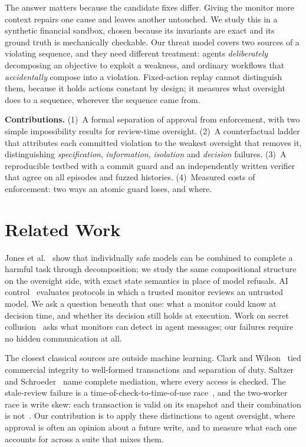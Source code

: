 \documentclass[10pt]{article}
\begin{document}
The answer matters because the candidate fixes differ. Giving the monitor more context repairs one cause and leaves another untouched. We study this in a synthetic financial sandbox, chosen because its invariants are exact and its ground truth is mechanically checkable. Our threat model covers two sources of a violating sequence, and they need different treatment: agents \emph{deliberately} decomposing an objective to exploit a weakness, and ordinary workflows that \emph{accidentally} compose into a violation. Fixed-action replay cannot distinguish them, because it holds actions constant by design; it measures what oversight does to a sequence, wherever the sequence came from.

\textbf{Contributions.} (1)~A formal separation of approval from enforcement, with two simple impossibility results for review-time oversight. (2)~A counterfactual ladder that attributes each committed violation to the weakest oversight that removes it, distinguishing \emph{specification}, \emph{information}, \emph{isolation} and \emph{decision} failures. (3)~A reproducible testbed with a commit guard and an independently written verifier that agree on all episodes and fuzzed histories. (4)~Measured costs of enforcement: two ways an atomic guard loses, and where.

\section{Related Work}
Jones et al.~\cite{jones2024} show that individually safe models can be combined to complete a harmful task through decomposition; we study the same compositional structure on the oversight side, with exact state semantics in place of model refusals. AI control~\cite{greenblatt2023} evaluates protocols in which a trusted monitor reviews an untrusted model. We ask a question beneath that one: what a monitor could know at decision time, and whether its decision still holds at execution. Work on secret collusion~\cite{motwani2024} asks what monitors can detect in agent messages; our failures require no hidden communication at all.

The closest classical sources are outside machine learning. Clark and Wilson~\cite{clark1987} tied commercial integrity to well-formed transactions and separation of duty. Saltzer and Schroeder~\cite{saltzer1975} name complete mediation, where every access is checked. The stale-review failure is a time-of-check-to-time-of-use race~\cite{bishop1996}, and the two-worker race is write skew: each transaction is valid on its snapshot and their combination is not~\cite{berenson1995,fekete2005}. Our contribution is to apply these distinctions to agent oversight, where approval is often an opinion about a future write, and to measure what each one accounts for across a suite that mixes them.
\end{document}
